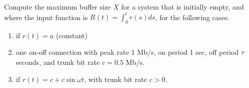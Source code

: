 \begin{problem}
Compute the maximum buffer size $X$ for a system that is initially
empty, and where the input function is $R(t)=\int_0^t r(s)ds$, for
the following cases.
 \begin{enumerate}
        \item  if $r(t) = a$ (constant)
        \item  one on-off connection with peak rate 1 Mb/s, on period 1 sec,
        off period $\tau$ seconds, and trunk bit rate $c=0.5$ Mb/s.
        \item  if $r(t) = c + c \sin \omega t$, with trunk bit rate $c >0$.
 \end{enumerate}
\end{problem}
